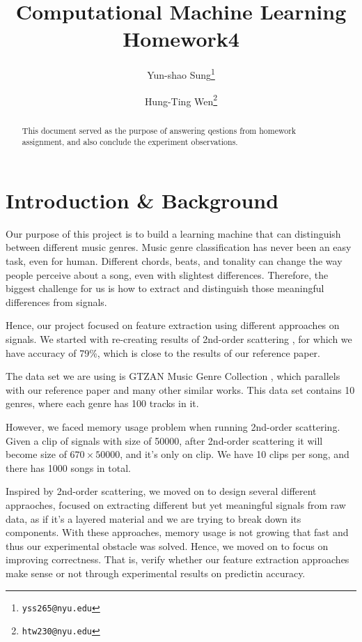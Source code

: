 \documentclass[final]{siamltexmm}
\title{Computational Machine Learning Homework4}
\author{Yun-shao Sung\thanks{\tt yss265@nyu.edu}
        \and Hung-Ting Wen\thanks{\tt htw230@nyu.edu}}
\begin{document}
\maketitle

\begin{abstract}
This document served as the purpose of answering qestions from homework assignment, and also conclude the experiment observations.
\end{abstract}

\pagestyle{myheadings}
\thispagestyle{plain}


\section{Introduction \& Background}
Our purpose of this project is to build a learning machine that can distinguish between different music genres.  Music genre classification has never been an easy task, even for human.  Different chords, beats, and tonality can change the way people perceive about a song, even with slightest differences.  Therefore, the biggest challenge for us is how to extract and distinguish those meaningful differences from signals.

Hence, our project focused on feature extraction using different approaches on signals.  We started with re-creating results of 2nd-order scattering \cite{mgc} , for which we have accuracy of 79\%, which is close to the results of our reference paper.

The data set we are using is GTZAN Music Genre Collection \cite{data} , which parallels with our reference paper and many other similar works.  This data set contains 10 genres, where each genre has 100 tracks in it.

However, we faced memory usage problem when running 2nd-order scattering.  Given a clip of signals with size of 50000, after 2nd-order scattering it will become size of $670 \times 50000$, and it's only on clip.  We have 10 clips per song, and there has 1000 songs in total.

Inspired by 2nd-order scattering, we moved on to design several different appraoches, focused on extracting different but yet meaningful signals from raw data, as if it's a layered material and we are trying to break down its components.  With these approaches, memory usage is not growing that fast and thus our experimental obstacle was solved.  Hence, we moved on to focus on improving correctness.  That is, verify whether our feature extraction approaches make sense or not through experimental results on predictin accuracy.
\end{document}

